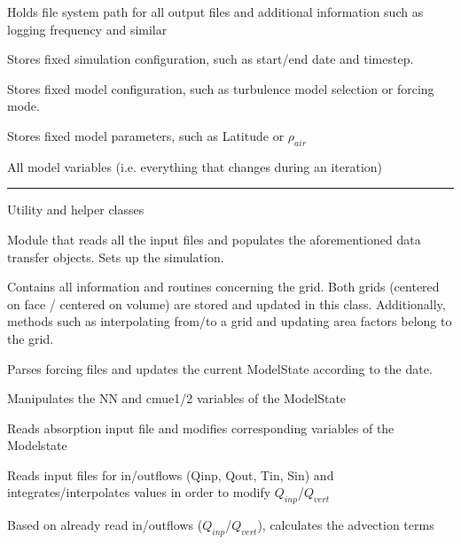 \documentclass[paper=a4, fontsize=12pt]{article}
\begin{document}
\begin{description}[style=nextline]
\begin{description}[style=multiline, leftmargin=17em]
		\item[OutputConfig] Holds file system path for all output files and additional information such as logging frequency and similar
		
		\item[SimConfig] Stores fixed simulation configuration, such as start/end date and timestep. 

		\item[ModelConfig] Stores fixed model configuration, such as turbulence model selection or forcing mode.
		
		\item[ModelParam] Stores fixed model parameters, such as Latitude or $\rho_{air}$
		
		\item[ModelState] All model variables (i.e. everything that changes during an iteration)
\end{description}

 \hrule
\item[Special classes] \noindent Utility and helper classes  
 \begin{description}[style=multiline, leftmargin=17em]
		\item[Inputfile] Module that reads all the input files and populates the aforementioned data transfer objects. Sets up the simulation.
		
		\item[Grid] Contains all information and routines concerning the grid. Both grids (centered on face / centered on volume) are stored and updated in this class. Additionally, methods such as interpolating from/to a grid and updating area factors belong to the grid.
		
		\item[Forcing] Parses forcing files and updates the current ModelState according to the date.

		\item[Stability] Manipulates the NN and cmue1/2 variables of the ModelState
\end{description}

		\item[Absorption] Reads absorption input file and modifies corresponding variables of the Modelstate
		
		\item[Lateral] Reads input files for in/outflows (Qinp, Qout, Tin, Sin) and integrates/interpolates values in order to modify $Q_{inp}$/$Q_{vert}$
		
		\item[Advection] Based on already read in/outflows ($Q_{inp}$/$Q_{vert}$), calculates the advection terms


\end{description}
\end{document}
